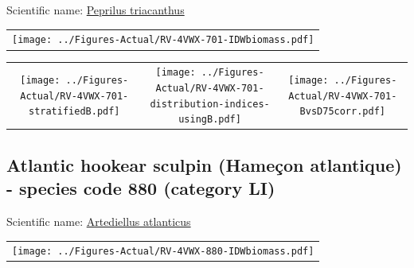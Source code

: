 \documentclass[12pt]{article}\usepackage[]{graphicx}\usepackage[]{color}
\begin{document}

Scientific name: \href{http://www.marinespecies.org/aphia.php?p=taxdetails\&id=159828}{Peprilus triacanthus} \newline
\begin{minipage}{1.0\textwidth}
 \begin{tabular}{c}
\texttt{[image: ../Figures-Actual/RV-4VWX-701-IDWbiomass.pdf]} \\ 
\end{tabular} 
\end{minipage}
\newline

\vspace{1cm}
\begin{minipage}{1.0\textwidth}
 \begin{tabular}{ccc}
\texttt{[image: ../Figures-Actual/RV-4VWX-701-stratifiedB.pdf]} & 
\texttt{[image: ../Figures-Actual/RV-4VWX-701-distribution-indices-usingB.pdf]} & 
\texttt{[image: ../Figures-Actual/RV-4VWX-701-BvsD75corr.pdf]} \\ 
\end{tabular} 
\end{minipage}
\clearpage

\renewcommand\thefigure{\thesubsection\Alph{figure}}

\setcounter{figure}{0}

\hypertarget{sec:880}{%
\subsection{Atlantic hookear sculpin (Hameçon atlantique) - species code 880 (category LI)}\label{sec:880}}

  


Scientific name: \href{http://www.marinespecies.org/aphia.php?p=taxdetails\&id=127193}{Artediellus atlanticus} \newline
\begin{minipage}{1.0\textwidth}
 \begin{tabular}{c}
\texttt{[image: ../Figures-Actual/RV-4VWX-880-IDWbiomass.pdf]} \\ 
\end{tabular} 
\end{minipage}
\newline
\end{document}
